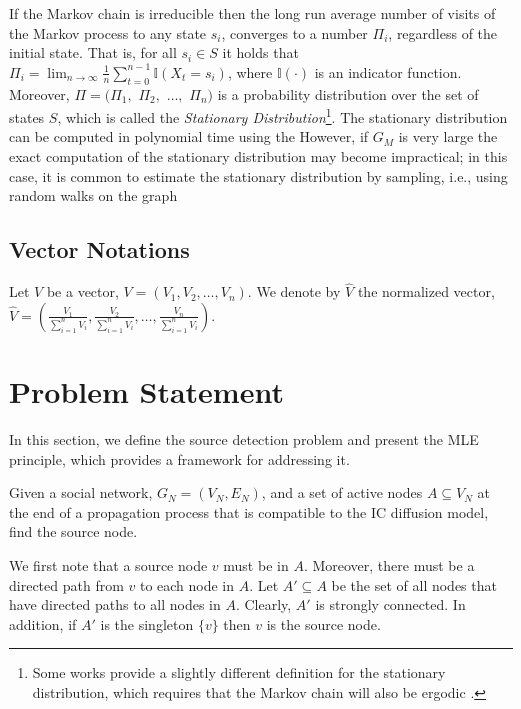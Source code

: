 \documentclass[sigconf,anonymous]{aamas}
\newcommand{\set}[1]{\{#1\}}
\begin{document}
If the Markov chain is irreducible
then the long run average number of visits
of the Markov process to any state $s_i$, converges to a number $\Pi_i$, 
regardless of the initial state. That is, for all 
$s_i\in S$ it holds that 
%
$\Pi_i = \lim_{n\rightarrow \infty}\frac{1}{n}\sum_{t=0}^{n-1} \mathbb{I}(X_t=s_i)$, 
%
%
where $\mathbb{I}(\cdot)$ is an indicator function. Moreover, $\Pi = (\Pi_1,$ $\Pi_2,$ $\ldots,$ $\Pi_n)$ is a probability distribution over the set of states $S$, which is called the \textit{Stationary Distribution}\footnote{Some works provide a slightly different definition for the stationary distribution, which requires that the Markov chain will also be ergodic \cite{batabyal2006markov}.}.
The stationary distribution can be computed in polynomial time using the  %
However, if $G_M$ is very large the exact computation of the stationary distribution may become impractical; in this case, it is common to estimate the stationary distribution by sampling, i.e., using random walks on the graph %

\subsection{Vector Notations}

Let $V$ be a vector, $V= (V_1, V_2, \ldots ,V_n)$. We denote by $\hat{V}$ the normalized vector, $\hat{V} = (\frac{V_1}{\sum_{i=1}^n V_i}, \frac{V_2}{\sum_{i=1}^n V_i}, \ldots ,\frac{V_n}{\sum_{i=1}^n V_i})$.



\section{Problem Statement} \label{sec: problem statement} 
In this section, we define the source detection problem and present the MLE principle, which provides a framework for addressing it.
\begin{definition}
Given a social network, $G_N=(V_N,E_N)$, and a set of active nodes $A\subseteq V_N$ at the end of a propagation process that is compatible to the IC diffusion model, find the source node. 
\end{definition}

We first note that a source node $v$ must be in $A$. Moreover, there must be a directed path from $v$ to each node in $A$. %
Let $A' \subseteq A$ be the set of all nodes that have directed paths to all nodes in $A$. Clearly, $A'$ is strongly connected.
In addition, if $A'$ is the singleton $\set{v}$ then $v$ is the source node.
\end{document}
